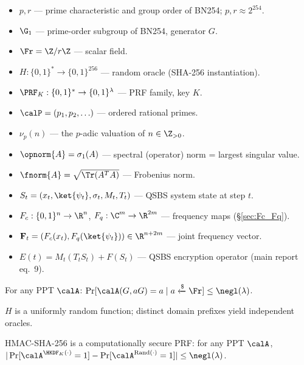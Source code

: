 \documentclass[11pt,letterpaper]{article}
\begin{document}
\begin{notation}\label{not:main}
\hfill
\begin{itemize}[leftmargin=*,noitemsep]
\item $p, r$ --- prime characteristic and group order of BN254; $p, r \approx 2^{254}$.
\item $\G_1$ --- prime-order subgroup of BN254, generator $G$.
\item $\Fr = \Z/r\Z$ --- scalar field.
\item $H:\{0,1\}^* \to \{0,1\}^{256}$ --- random oracle (SHA-256 instantiation).
\item $\PRF_K:\{0,1\}^*\to\{0,1\}^\lambda$ --- PRF family, key $K$.
\item $\calP = (p_1, p_2, \ldots)$ --- ordered rational primes.
\item $\nu_{p}(n)$ --- the $p$-adic valuation of $n \in \Z_{>0}$.
\item $\opnorm{A} = \sigma_1(A)$ --- spectral (operator) norm = largest singular value.
\item $\fnorm{A} = \sqrt{\Tr(A^T A)}$ --- Frobenius norm.
\item $S_t = (x_t, \ket{\psi_t}, \sigma_t, M_t, T_t)$ --- QSBS system state at step $t$.
\item $F_c : \{0,1\}^n \to \R^n$, $F_q : \C^m \to \R^{2m}$ --- frequency maps (\S\ref{sec:Fc_Fq}).
\item $\mathbf{F}_t = (F_c(x_t), F_q(\ket{\psi_t})) \in \R^{n+2m}$ --- joint frequency vector.
\item $E(t) = M_t(T_t S_t) + F(S_t)$ --- QSBS encryption operator (main report eq.\ 9).
\end{itemize}
\end{notation}

\begin{assumption}\label{asm:dl}
For any PPT $\calA$:
$\Pr[\calA(G, aG)=a \mid a\xleftarrow{\$}\Fr] \leq \negl(\lambda)$.
\end{assumption}

\begin{assumption}\label{asm:rom}
$H$ is a uniformly random function; distinct domain prefixes yield independent oracles.
\end{assumption}

\begin{assumption}\label{asm:prf}
HMAC-SHA-256 is a computationally secure PRF: for any PPT $\calA$,
$|\Pr[\calA^{\HKDF_K(\cdot)}=1] - \Pr[\calA^{\mathrm{Rand}(\cdot)}=1]|\leq\negl(\lambda)$.
\end{assumption}
\end{document}
